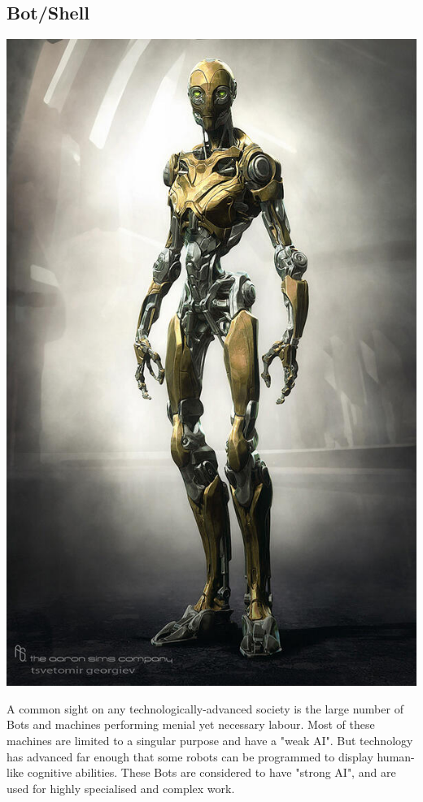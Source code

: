 \documentclass[10pt,twoside]{article}
\begin{document}
\begin{multicols}{2}
  \columnbreak

  \subsection{Bot/Shell}

  \includegraphics[width=\linewidth]{BEzZuPdCEAAgcr8}

  A common sight on any technologically-advanced society is the large number of Bots and machines performing menial yet necessary labour. Most of these machines are limited to a singular purpose and have a "weak AI". But technology has advanced far enough that some robots can be programmed to display human-like cognitive abilities. These Bots are considered to have "strong AI", and are used for highly specialised and complex work.


\end{multicols}
\end{document}
